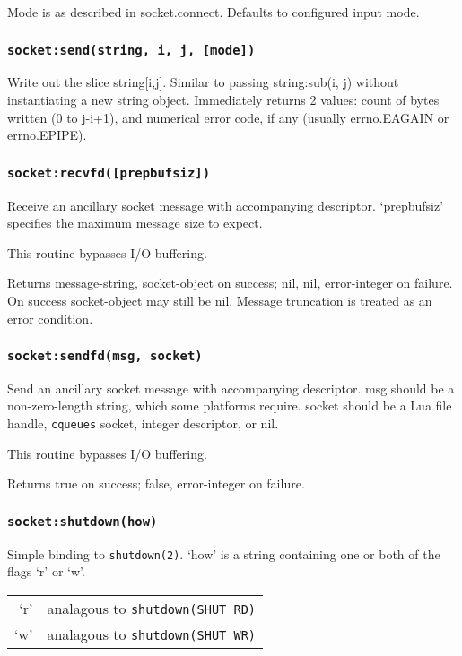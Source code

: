 \documentclass[11pt, oneside]{memoir}
\newcommand*{\cqueues}[0]{\texttt{cqueues}\xspace}
\newcommand*{\syscall}[1]{\texttt{#1}\xspace}
\newcommand*{\fn}[1]{\texttt{#1}\xspace}
\begin{document}
	Mode is as described in socket.connect. Defaults to configured
	input mode.

\subsubsection[\fn{socket:send}]{\fn{socket:send(string, i, j, [mode])}}
	Write out the slice string[i,j]. Similar to passing string:sub(i, j)
	without instantiating a new string object. Immediately returns 2
	values: count of bytes written (0 to j-i+1), and numerical error
	code, if any (usually errno.EAGAIN or errno.EPIPE).

\subsubsection[\fn{socket:recvfd}]{\fn{socket:recvfd([prepbufsiz])}}
	Receive an ancillary socket message with accompanying descriptor.
	`prepbufsiz' specifies the maximum message size to expect.

	This routine bypasses I/O buffering.

	Returns message-string, socket-object on success; nil, nil,
	error-integer on failure. On success socket-object may still be nil.
	Message truncation is treated as an error condition.

\subsubsection[\fn{socket:sendfd}]{\fn{socket:sendfd(msg, socket)}}
	Send an ancillary socket message with accompanying descriptor. msg
	should be a non-zero-length string, which some platforms require.
	socket should be a Lua file handle, \cqueues socket, integer
	descriptor, or nil.

	This routine bypasses I/O buffering.

	Returns true on success; false, error-integer on failure.

\subsubsection[\fn{socket:shutdown}]{\fn{socket:shutdown(how)}}
Simple binding to \syscall{shutdown(2)}. `how' is a string containing one or both of the flags `r' or `w'.

\begin{tabular}{r | l}
`r' & analagous to \syscall{shutdown(SHUT\_RD)} \\
`w' & analagous to \syscall{shutdown(SHUT\_WR)} \\
\end{tabular}
\end{document}
